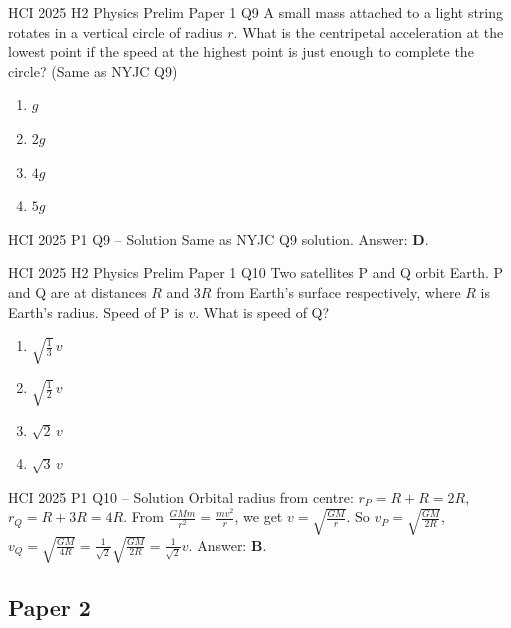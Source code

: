 \documentclass[11pt]{beamer}
\begin{document}
\begin{frame}[shrink=15]{HCI 2025 H2 Physics Prelim Paper 1 Q9}
A small mass attached to a light string rotates in a vertical circle of radius $r$. What is the centripetal acceleration at the lowest point if the speed at the highest point is just enough to complete the circle? (Same as NYJC Q9)
\begin{enumerate}[A]
    \item $g$
    \item $2g$
    \item $4g$
    \item $5g$
\end{enumerate}
\end{frame}

\begin{frame}{HCI 2025 P1 Q9 – Solution}
Same as NYJC Q9 solution. Answer: \textbf{D}.
\end{frame}

\begin{frame}[shrink=15]{HCI 2025 H2 Physics Prelim Paper 1 Q10}
Two satellites P and Q orbit Earth. P and Q are at distances $R$ and $3R$ from Earth's surface respectively, where $R$ is Earth's radius. Speed of P is $v$. What is speed of Q?
\begin{enumerate}[A]
    \item $\sqrt{\frac13}\,v$
    \item $\sqrt{\frac12}\,v$
    \item $\sqrt{2}\,v$
    \item $\sqrt{3}\,v$
\end{enumerate}
\end{frame}

\begin{frame}{HCI 2025 P1 Q10 – Solution}
Orbital radius from centre: $r_P = R + R = 2R$, $r_Q = R + 3R = 4R$.
From $\frac{GMm}{r^2} = \frac{mv^2}{r}$, we get $v = \sqrt{\frac{GM}{r}}$.
So $v_P = \sqrt{\frac{GM}{2R}}$, $v_Q = \sqrt{\frac{GM}{4R}} = \frac{1}{\sqrt2}\sqrt{\frac{GM}{2R}} = \frac{1}{\sqrt2}v$.
Answer: \textbf{B}.
\end{frame}

\subsection{Paper 2}
\end{document}
